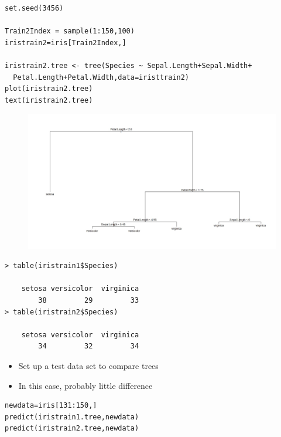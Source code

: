\documentclass[caret-main.tex]{subfiles}
\begin{document}
\begin{framed}
\begin{verbatim}
set.seed(3456)

Train2Index = sample(1:150,100)
iristrain2=iris[Train2Index,]

iristrain2.tree <- tree(Species ~ Sepal.Length+Sepal.Width+
  Petal.Length+Petal.Width,data=iristtrain2)
plot(iristrain2.tree)
text(iristrain2.tree)
\end{verbatim}
\end{framed}
\begin{figure}[h!]
\centering
\includegraphics[width=0.80\linewidth]{./iristree3}
\caption{}
\label{fig:iristree2}
\end{figure}

\newpage


\begin{verbatim}
> table(iristrain1$Species)

    setosa versicolor  virginica 
        38         29         33 
> table(iristrain2$Species)

    setosa versicolor  virginica 
        34         32         34 
\end{verbatim}

\begin{itemize}
\item Set up a test data set to compare trees 
\item In this case, probably little difference
\end{itemize}

\begin{framed}
\begin{verbatim}
newdata=iris[131:150,]
predict(iristrain1.tree,newdata)
predict(iristrain2.tree,newdata)
\end{verbatim}
\end{framed}
\newpage
\end{document}
